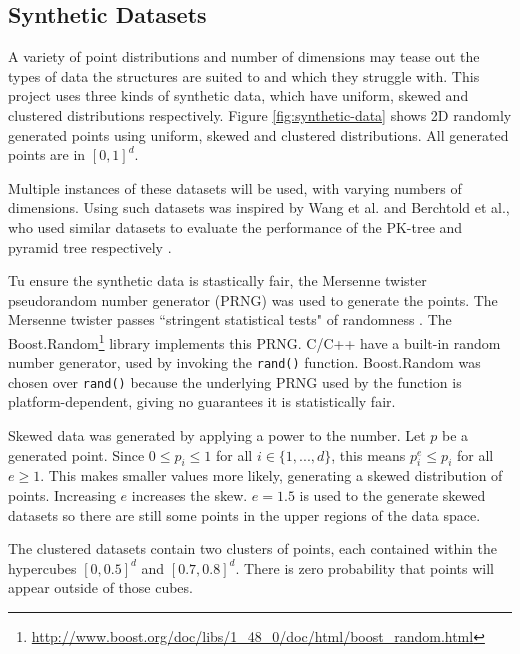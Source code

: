 \subsection{Synthetic Datasets}

A variety of point distributions and number of dimensions may tease out the types of data the structures are suited to and which they struggle with. This project uses three kinds of synthetic data, which have uniform, skewed and clustered distributions respectively. Figure \ref{fig:synthetic-data} shows 2D randomly generated points using uniform, skewed and clustered distributions. All generated points are in $[0,1]^d$.

Multiple instances of these datasets will be used, with varying numbers of dimensions. Using such datasets was inspired by Wang et al. and Berchtold et al., who used similar datasets to evaluate the performance of the PK-tree and pyramid tree respectively \cite{pk-tree, pyramid-tree}.

Tu ensure the synthetic data is stastically fair, the Mersenne twister pseudorandom number generator (PRNG) \cite{mersenne-twister} was used to generate the points.  The Mersenne twister passes ``stringent statistical tests" of randomness \cite{mersenne-twister}. The Boost.Random\footnote{\url{http://www.boost.org/doc/libs/1_48_0/doc/html/boost_random.html}} library implements this PRNG. C/C++ have a built-in random number generator, used by invoking the \texttt{rand()} function. Boost.Random was chosen over \texttt{rand()} because the underlying PRNG used by the function is platform-dependent, giving no guarantees it is statistically fair.

Skewed data was generated by applying a power to the number. Let $p$ be a generated point. Since $0 \leq p_i \leq 1$ for all $i \in \lbrace 1, ..., d \rbrace$, this means $p_i^e \leq p_i$ for all $e \geq 1$. This makes smaller values more likely, generating a skewed distribution of points. Increasing $e$ increases the skew. $e = 1.5$ is used to the generate skewed datasets so there are still some points in the upper regions of the data space.

The clustered datasets contain two clusters of points, each contained within the hypercubes $[0,0.5]^d$ and $[0.7,0.8]^d$. There is zero probability that points will appear outside of those cubes.

